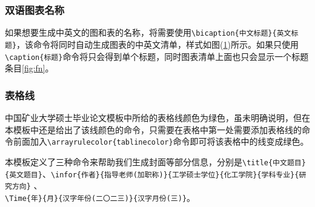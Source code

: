 \subsubsection{双语图表名称}
如果想要生成中英文的图和表的名称，将需要使用\verb|\bicaption{中文标题}{英文标题}|，该命令将同时自动生成图表的中英文清单，样式如图(\ref{fig:f-tN})所示。如果只使用\verb|\caption{标题}|命令将只会得到单个标题，同时图表清单上面也只会显示一个标题条目\ref{fig:fn}。\par
\begin{figure}
	\centering
	\label{fig:f-tN}
\end{figure}
\subsubsection{表格线}
中国矿业大学硕士毕业论文模板中所给的表格线颜色为绿色，虽未明确说明，但在本模板中还是给出了该线颜色的命令，只需要在表格中第一处需要添加表格线的命令前面加入\verb|\arrayrulecolor{tablinecolor}|命令即可将该表格中的线变成绿色。

本模板定义了三种命令来帮助我们生成封面等部分信息，分别是\verb|\title{中文题目}{英文题目}|、\verb|\infor{作者}{指导老师(加职称)}{工学硕士学位}{化工学院}{学科专业}{研究方向}| 、\\ \verb|\Time{年}{月}{汉字年份(二〇二三)}{汉字月份(三)}|。


